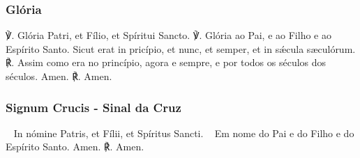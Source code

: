 \pagebreak[3]\subsubsection{Glória}
\begin{paracol}{2}
{\redx ℣.} Glória Patri, et Fílio, et Spíritui Sancto.
\switchcolumn
{\redx ℣.} Glória ao Pai, e ao Filho e ao Espírito Santo.
 Sicut erat in pricípio, et nunc, et semper, et in sǽcula sæculórum.
\switchcolumn
{\redx ℟.} Assim como era no princípio, agora e sempre, e por todos os séculos dos
séculos.
 Amen.
\switchcolumn
{\redx ℟.} Amen.
\end{paracol}

\emph{}

\emph{}

\subsubsection{Signum Crucis - Sinal da Cruz}
\begin{paracol}{2}
{\redx ~} In nómine Patris, et Fílii, et Spíritus Sancti.
\switchcolumn
{\redx ~} Em nome do Pai e do Filho e do Espírito Santo.
 Amen.
\switchcolumn
{\redx ℟.} Amen.
\end{paracol}

\emph{}

\mbox{}
\vfill
\begin{nscenter}
\end{nscenter}
